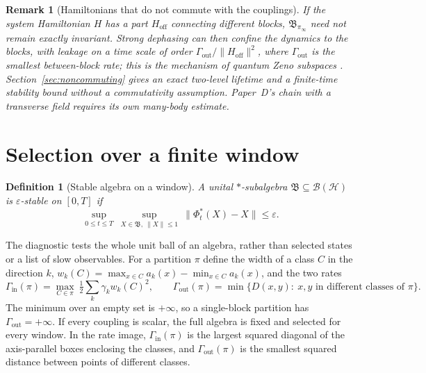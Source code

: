\documentclass[12pt,a4paper]{article}
\newtheorem{definition}[theorem]{Definition}
\newtheorem{remark}[theorem]{Remark}
\newcommand{\Hil}{\mathcal H}
\newcommand{\B}{\mathfrak B}
\newcommand{\Gin}{\Gamma_{\mathrm{in}}}
\newcommand{\Gout}{\Gamma_{\mathrm{out}}}
\begin{document}
\begin{remark}[Hamiltonians that do not commute with the couplings]
\label{rem:hamiltonian}
If the system Hamiltonian $H$ has a part $H_{\mathrm{off}}$ connecting different blocks, $\B_{\pi_\infty}$ need not remain exactly invariant. Strong dephasing can then confine the dynamics to the blocks, with leakage on a time scale of order $\Gout/\|H_{\mathrm{off}}\|^2$, where $\Gout$ is the smallest between-block rate; this is the mechanism of quantum Zeno subspaces \cite{FacchiPascazio2002}. Section~\ref{sec:noncommuting} gives an exact two-level lifetime and a finite-time stability bound without a commutativity assumption. Paper~D's chain with a transverse field requires its own many-body estimate.
\end{remark}

\section{Selection over a finite window}
\label{sec:window}

\begin{definition}[Stable algebra on a window]
\label{def:stable}
A unital $*$-subalgebra $\B\subseteq\mathcal B(\Hil)$ is $\varepsilon$-stable on $[0,T]$ if
\[
\sup_{0\le t\le T}\ \sup_{X\in\B,\ \|X\|\le1}\ \|\Phi_t^*(X)-X\|\le\varepsilon .
\]
\end{definition}

The diagnostic tests the whole unit ball of an algebra, rather than selected states or a list of slow observables. For a partition $\pi$ define the width of a class $C$ in the direction $k$, $w_k(C)=\max_{x\in C}a_k(x)-\min_{x\in C}a_k(x)$, and the two rates
\begin{equation}
\Gin(\pi)=\max_{C\in\pi}\ \tfrac12\sum_k\gamma_kw_k(C)^2,
\qquad
\Gout(\pi)=\min\{D(x,y):\ x,y\text{ in different classes of }\pi\}.
\label{eq:rates}
\end{equation}
The minimum over an empty set is $+\infty$, so a single-block partition has $\Gout=+\infty$. If every coupling is scalar, the full algebra is fixed and selected for every window.
In the rate image, $\Gin(\pi)$ is the largest squared diagonal of the axis-parallel boxes enclosing the classes, and $\Gout(\pi)$ is the smallest squared distance between points of different classes.
\end{document}
